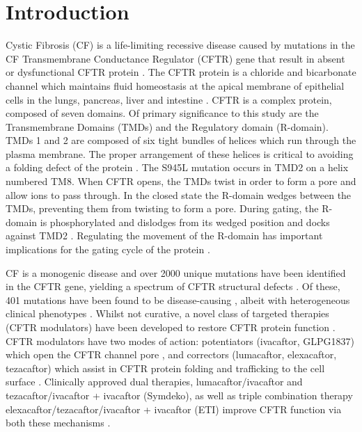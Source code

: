 \section{Introduction}
Cystic Fibrosis (CF) is a life-limiting recessive disease \cite{mall2014, elborn2016} caused by mutations in the CF Transmembrane Conductance Regulator (CFTR) gene that result in absent or dysfunctional CFTR protein \cite{rowe2005}. The CFTR protein is a chloride and bicarbonate channel \cite{veit2016} which maintains fluid homeostasis at the apical membrane of epithelial cells \cite{riordan1989} in the lungs, pancreas, liver and intestine \cite{ratjen2015}. CFTR is a complex protein, composed of seven domains. Of primary significance to this study are the Transmembrane Domains (TMDs) and the Regulatory domain (R-domain). TMDs 1 and 2 are composed of six tight bundles of helices which run through the plasma membrane. The proper arrangement of these helices is critical to avoiding a folding defect of the protein \cite{fiedorczuk2022}. The S945L mutation occurs in TMD2 on a helix numbered TM8. When CFTR opens, the TMDs twist in order to form a pore and allow ions to pass through. In the closed state the R-domain wedges between the TMDs, preventing them from twisting to form a pore. During gating, the R-domain is phosphorylated and dislodges from its wedged position and docks against TMD2 \cite{zhang2018}. Regulating the movement of the R-domain has important implications for the gating cycle of the protein \cite{mihalyi2020}.

CF is a monogenic disease and over 2000 unique mutations have been identified in the CFTR gene, yielding a spectrum of CFTR structural defects \cite{deboeck2016}. Of these, 401 mutations have been found to be disease-causing \cite{cftr2}, albeit with heterogeneous clinical phenotypes \cite{bonadia2014}. Whilst not curative, a novel class of targeted therapies (CFTR modulators) have been developed to restore CFTR protein function \cite{awatade2018}. CFTR modulators have two modes of action:  potentiators (ivacaftor, GLPG1837) which open the CFTR channel pore \cite{vangoor2009, accurso2010, yu2012, rosenfeld2018}, and correctors (lumacaftor, elexacaftor, tezacaftor) which assist in CFTR protein folding and trafficking to the cell surface \cite{lopes-pacheco2017, dekkers2016b}. Clinically approved dual therapies, lumacaftor/ivacaftor and tezacaftor/ivacaftor + ivacaftor (Symdeko), as well as triple combination therapy elexacaftor/tezacaftor/ivacaftor + ivacaftor (ETI) improve CFTR function via both these mechanisms \cite{ wainwright2015,rowe2017, middleton2019}. 


